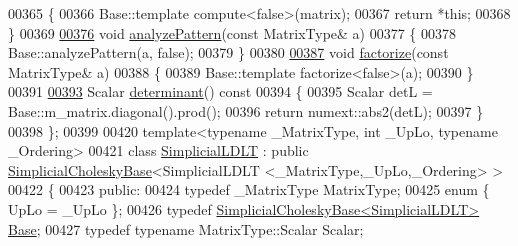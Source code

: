 \begin{DoxyCode}
00365     \{
00366       Base::template compute<false>(matrix);
00367       \textcolor{keywordflow}{return} *\textcolor{keyword}{this};
00368     \}
00369 
\hyperlink{group___sparse_cholesky___module_ad6e49b1c0d2ec5c8e118538260f3002c}{00376}     \textcolor{keywordtype}{void} \hyperlink{group___sparse_cholesky___module_ad6e49b1c0d2ec5c8e118538260f3002c}{analyzePattern}(\textcolor{keyword}{const} MatrixType& a)
00377     \{
00378       Base::analyzePattern(a, \textcolor{keyword}{false});
00379     \}
00380 
\hyperlink{group___sparse_cholesky___module_a8a140b34b08df74c7426ee29b986b228}{00387}     \textcolor{keywordtype}{void} \hyperlink{group___sparse_cholesky___module_a8a140b34b08df74c7426ee29b986b228}{factorize}(\textcolor{keyword}{const} MatrixType& a)
00388     \{
00389       Base::template factorize<false>(a);
00390     \}
00391 
\hyperlink{group___sparse_cholesky___module_a956595848e6fac7a389d091b3fdc9567}{00393}     Scalar \hyperlink{group___sparse_cholesky___module_a956595848e6fac7a389d091b3fdc9567}{determinant}()\textcolor{keyword}{ const}
00394 \textcolor{keyword}{    }\{
00395       Scalar detL = Base::m\_matrix.diagonal().prod();
00396       \textcolor{keywordflow}{return} numext::abs2(detL);
00397     \}
00398 \};
00399 
00420 \textcolor{keyword}{template}<\textcolor{keyword}{typename} \_MatrixType, \textcolor{keywordtype}{int} \_UpLo, \textcolor{keyword}{typename} \_Ordering>
00421     \textcolor{keyword}{class }\hyperlink{group___sparse_cholesky___module_class_eigen_1_1_simplicial_l_d_l_t}{SimplicialLDLT} : \textcolor{keyword}{public} \hyperlink{group___sparse_cholesky___module_class_eigen_1_1_simplicial_cholesky_base}{SimplicialCholeskyBase}<SimplicialLDLT
      <\_MatrixType,\_UpLo,\_Ordering> >
00422 \{
00423 \textcolor{keyword}{public}:
00424     \textcolor{keyword}{typedef} \_MatrixType MatrixType;
00425     \textcolor{keyword}{enum} \{ UpLo = \_UpLo \};
00426     \textcolor{keyword}{typedef} \hyperlink{group___sparse_cholesky___module_class_eigen_1_1_simplicial_cholesky_base}{SimplicialCholeskyBase<SimplicialLDLT>} 
      \hyperlink{group___sparse_cholesky___module_class_eigen_1_1_simplicial_cholesky_base}{Base};
00427     \textcolor{keyword}{typedef} \textcolor{keyword}{typename} MatrixType::Scalar Scalar;

\end{DoxyCode}
